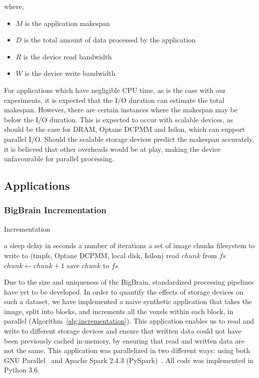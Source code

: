 \documentclass[conference]{IEEEtran}
\newcommand{\Desc}[2]{\State \makebox[2em][l]{#1}#2}
\newcommand{\bigbrain}{BigBrain\xspace}
\begin{document}
where,
\begin{itemize}
        \item $M$ is the application makespan
        \item $D$ is the total amount of data processed by the application
        \item $R$ is the device read bandwidth
        \item $W$ is the device write bandwidth
\end{itemize}

For applications which have negligible CPU time, as is the case with our experiments, 
it is expected that the I/O duration can estimate the total makespan. However, there
are certain instances where the makespan may be below the I/O duration. This is expected
to occur with scalable devices, as should be the
case for DRAM, Optane DCPMM and Isilon, which can support parallel I/O. Should the
scalable storage devices predict the makespan accurately, it is believed that other overheads
would be at play, making the device unfavourable for parallel processing.

\subsection{Applications}
\subsubsection{ \bigbrain Incrementation}

\begin{algorithm}\caption{Incrementation}\label{alg:incrementation}
    \begin{algorithmic}[1]
    \Input
        \Desc{$x$}{a sleep delay in seconds}
        \Desc{$n$}{a number of iterations}
        \Desc{$C$}{a set of image chunks}
        \Desc{$fs$}{filesystem to write to (tmpfs, Optane DCPMM, local disk, Isilon)}
    \EndInput
        \State read $chunk$ from $fs$
        \State $chunk\gets chunk+1$
        \State save $chunk$ to $fs$
    \EndFor
    \end{algorithmic}
\end{algorithm}  

Due to the size and uniqueness of the \bigbrain, standardized processing pipelines
have yet to be developed. In order to quantify the effects of storage devices
on such a dataset, we have implemented a naive synthetic application that takes 
the image, split into blocks, and increments all the voxels within each block, in parallel (Algorithm~\ref{alg:incrementation}).
This application
enables us to read and write to different storage devices and ensure that written
data could not have been previously cached
in-memory, by ensuring that read and written data are not the same. This application
was parallelized in two different ways: using both GNU Parallel~\cite{gnuparallel} and Apache Spark 2.4.3 (PySpark)~\cite{spark}. 
All code was implemented in Python 3.6.
\end{document}
